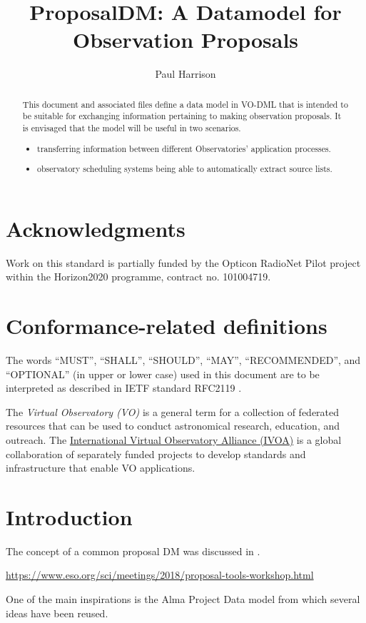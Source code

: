 \documentclass[11pt,a4paper]{ivoa}
\title{ProposalDM: A Datamodel for Observation Proposals}
\author[????URL????]{Paul Harrison}
\begin{document}
\begin{abstract}
This document and associated files define a data model in VO-DML that is intended to be suitable for exchanging
    information pertaining to making observation proposals. It is envisaged that the model will be useful in two scenarios.
\begin{itemize}
    \item transferring information between different Observatories' application processes.
    \item observatory scheduling systems being able to automatically extract source lists.
\end{itemize}
\end{abstract}


\section*{Acknowledgments}

Work on this standard is partially funded by the Opticon RadioNet Pilot project within the Horizon2020 programme, contract no. 101004719.

\section*{Conformance-related definitions}

The words ``MUST'', ``SHALL'', ``SHOULD'', ``MAY'', ``RECOMMENDED'', and
``OPTIONAL'' (in upper or lower case) used in this document are to be
interpreted as described in IETF standard RFC2119 \citep{std:RFC2119}.

The \emph{Virtual Observatory (VO)} is a
general term for a collection of federated resources that can be used
to conduct astronomical research, education, and outreach.
The \href{https://www.ivoa.net}{International
Virtual Observatory Alliance (IVOA)} is a global
collaboration of separately funded projects to develop standards and
infrastructure that enable VO applications.


\section{Introduction}


The concept of a common proposal DM was discussed in \cite{2008SPIE.7019E..0PB}.

\url{https://www.eso.org/sci/meetings/2018/proposal-tools-workshop.html}

One of the main inspirations is the Alma Project Data model
\cite{alma:projdm} from which several ideas have been reused.
\end{document}
